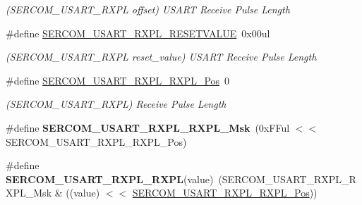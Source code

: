 \begin{DoxyCompactItemize}
\begin{DoxyCompactList}\small\item\em (S\+E\+R\+C\+O\+M\+\_\+\+U\+S\+A\+R\+T\+\_\+\+R\+X\+P\+L offset) U\+S\+A\+R\+T Receive Pulse Length \end{DoxyCompactList}\item 
\hypertarget{group___s_a_m_l21___s_e_r_c_o_m_ga45653cf47286dc78ca1c2e1c3aa85bdb}{}\#define \hyperlink{group___s_a_m_l21___s_e_r_c_o_m_ga45653cf47286dc78ca1c2e1c3aa85bdb}{S\+E\+R\+C\+O\+M\+\_\+\+U\+S\+A\+R\+T\+\_\+\+R\+X\+P\+L\+\_\+\+R\+E\+S\+E\+T\+V\+A\+L\+U\+E}~0x00ul\label{group___s_a_m_l21___s_e_r_c_o_m_ga45653cf47286dc78ca1c2e1c3aa85bdb}

\begin{DoxyCompactList}\small\item\em (S\+E\+R\+C\+O\+M\+\_\+\+U\+S\+A\+R\+T\+\_\+\+R\+X\+P\+L reset\+\_\+value) U\+S\+A\+R\+T Receive Pulse Length \end{DoxyCompactList}\item 
\hypertarget{group___s_a_m_l21___s_e_r_c_o_m_gaf83ecdf21b219c233a70466b65030878}{}\#define \hyperlink{group___s_a_m_l21___s_e_r_c_o_m_gaf83ecdf21b219c233a70466b65030878}{S\+E\+R\+C\+O\+M\+\_\+\+U\+S\+A\+R\+T\+\_\+\+R\+X\+P\+L\+\_\+\+R\+X\+P\+L\+\_\+\+Pos}~0\label{group___s_a_m_l21___s_e_r_c_o_m_gaf83ecdf21b219c233a70466b65030878}

\begin{DoxyCompactList}\small\item\em (S\+E\+R\+C\+O\+M\+\_\+\+U\+S\+A\+R\+T\+\_\+\+R\+X\+P\+L) Receive Pulse Length \end{DoxyCompactList}\item 
\hypertarget{group___s_a_m_l21___s_e_r_c_o_m_gae65d20c015dba79f82f04a8d03155500}{}\#define {\bfseries S\+E\+R\+C\+O\+M\+\_\+\+U\+S\+A\+R\+T\+\_\+\+R\+X\+P\+L\+\_\+\+R\+X\+P\+L\+\_\+\+Msk}~(0x\+F\+Ful $<$$<$ S\+E\+R\+C\+O\+M\+\_\+\+U\+S\+A\+R\+T\+\_\+\+R\+X\+P\+L\+\_\+\+R\+X\+P\+L\+\_\+\+Pos)\label{group___s_a_m_l21___s_e_r_c_o_m_gae65d20c015dba79f82f04a8d03155500}

\item 
\hypertarget{group___s_a_m_l21___s_e_r_c_o_m_ga9045adcb8c8fff34498d747be727cf5c}{}\#define {\bfseries S\+E\+R\+C\+O\+M\+\_\+\+U\+S\+A\+R\+T\+\_\+\+R\+X\+P\+L\+\_\+\+R\+X\+P\+L}(value)~(S\+E\+R\+C\+O\+M\+\_\+\+U\+S\+A\+R\+T\+\_\+\+R\+X\+P\+L\+\_\+\+R\+X\+P\+L\+\_\+\+Msk \& ((value) $<$$<$ \hyperlink{group___s_a_m_l21___s_e_r_c_o_m_gaf83ecdf21b219c233a70466b65030878}{S\+E\+R\+C\+O\+M\+\_\+\+U\+S\+A\+R\+T\+\_\+\+R\+X\+P\+L\+\_\+\+R\+X\+P\+L\+\_\+\+Pos}))\label{group___s_a_m_l21___s_e_r_c_o_m_ga9045adcb8c8fff34498d747be727cf5c}


\end{DoxyCompactItemize}
